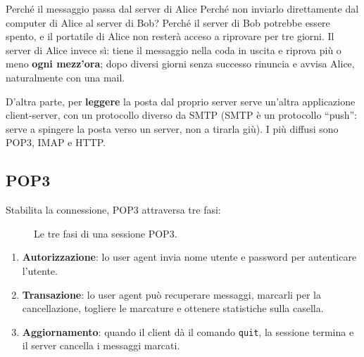 \begin{esempio}{Perché il messaggio passa dal server di Alice}
Perché non inviarlo direttamente dal computer di Alice al server di Bob? Perché il server di Bob potrebbe essere
spento, e il portatile di Alice non resterà acceso a riprovare per tre giorni. Il server di Alice invece sì: tiene
il messaggio nella coda in uscita e riprova più o meno \textbf{ogni mezz'ora}; dopo diversi giorni senza successo
rinuncia e avvisa Alice, naturalmente con una mail.
\end{esempio}

D'altra parte, per \textbf{leggere} la posta dal proprio server serve un'altra applicazione
client-server, con un protocollo diverso da SMTP (SMTP è un protocollo ``push'': serve a spingere la
posta verso un server, non a tirarla giù). I più diffusi sono POP3, IMAP e HTTP.

\subsection{POP3}


Stabilita la connessione, POP3 attraversa tre fasi:

\begin{figure}[H]
\centering
{}
\caption{Le tre fasi di una sessione POP3.}
\end{figure}

\begin{enumerate}
    \item \textbf{Autorizzazione}: lo user agent invia nome utente e password per autenticare l'utente.
    \item \textbf{Transazione}: lo user agent può recuperare messaggi, marcarli per la cancellazione, togliere
          le marcature e ottenere statistiche sulla casella.
    \item \textbf{Aggiornamento}: quando il client dà il comando \texttt{quit}, la sessione termina e il server
          cancella i messaggi marcati.
\end{enumerate}

